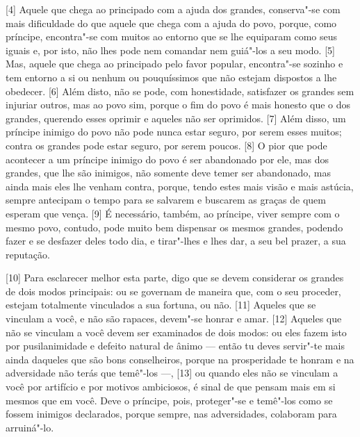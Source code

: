 {[}4{]} Aquele que chega ao principado com a ajuda dos grandes,
conserva"-se com mais dificuldade do que aquele que chega com a ajuda do
povo, porque, como príncipe, encontra"-se com muitos ao entorno que se
lhe equiparam como seus iguais e, por isto, não lhes pode nem comandar
nem guiá"-los a seu modo. {[}5{]} Mas, aquele que chega ao principado
pelo favor popular, encontra"-se sozinho e tem entorno a si ou nenhum ou
pouquíssimos que não estejam dispostos a lhe obedecer. {[}6{]} Além
disto, não se pode, com honestidade, satisfazer os grandes sem injuriar
outros, mas ao povo sim, porque o fim do povo é mais honesto que o dos
grandes, querendo esses oprimir e aqueles não ser oprimidos. {[}7{]} Além disso, um príncipe inimigo do povo não
pode nunca estar seguro, por serem esses muitos; contra os grandes pode
estar seguro, por serem poucos. {[}8{]} O pior que pode acontecer a um
príncipe inimigo do povo é ser abandonado por ele, mas dos grandes, que
lhe são inimigos, não somente deve temer ser abandonado, mas ainda mais
eles lhe venham contra, porque, tendo estes mais visão e mais astúcia,
sempre antecipam o tempo para se salvarem e buscarem as graças de quem
esperam que vença. {[}9{]} É necessário, também, ao príncipe, viver
sempre com o mesmo povo, contudo, pode muito bem dispensar os mesmos
grandes, podendo fazer e se desfazer deles todo dia, e tirar"-lhes e lhes
dar, a seu bel prazer, a sua reputação.

{[}10{]} Para esclarecer melhor esta parte, digo que se devem considerar
os grandes de dois modos principais: ou se governam de maneira que, com
o seu proceder, estejam totalmente vinculados a sua fortuna, ou não.
{[}11{]} Aqueles que se vinculam a você, e não são rapaces, devem"-se
honrar e amar. {[}12{]} Aqueles que não se vinculam a você devem ser
examinados de dois modos: ou eles fazem isto por pusilanimidade e
defeito natural de ânimo --- então tu deves
servir"-te mais ainda daqueles que são bons conselheiros, porque na
prosperidade te honram e na adversidade não terás que temê"-los ---,
{[}13{]} ou quando eles não se vinculam a você por artifício e por
motivos ambiciosos, é sinal de que pensam mais em si mesmos que em você.
Deve o príncipe, pois, proteger"-se e temê"-los como se fossem inimigos
declarados, porque sempre, nas adversidades, colaboram para arruiná"-lo.

